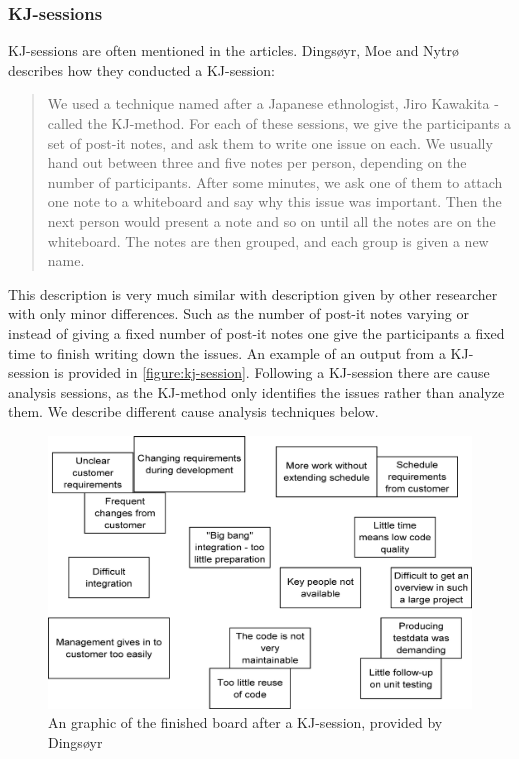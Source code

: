 \documentclass[12pt]{article}
\begin{document}
\subsubsection{KJ-sessions}
KJ-sessions are often mentioned in the articles. Dingsøyr, Moe and Nytrø~\cite{Moe2001} describes how they conducted a KJ-session: 
\begin{quote} We used a technique named after a Japanese ethnologist, Jiro Kawakita - called the KJ-method. For each of these sessions, we give the participants a set of post-it notes, and ask them to write one issue on each. We usually hand out between three and five notes per person, depending on the number of participants. After some minutes, we ask one of them to attach one note to a whiteboard and say why this issue was important. Then the next person would present a note and so on until all the notes are on the whiteboard. The notes are then grouped, and each group is given a new name. 
\end{quote}
This description is very much similar with description given by other researcher with only minor differences. Such as the number of post-it notes varying or instead of giving a fixed number of post-it notes one give the participants a fixed time to finish writing down the issues. An example of an output from a KJ-session is provided in \autoref{figure:kj-session}.  Following a KJ-session there are cause analysis sessions, as the KJ-method only identifies the issues rather than analyze them. We describe different cause analysis techniques below. 

\begin{figure}[h!]
	\centering
	\includegraphics[width=\textwidth]{figures/KJ-session.png}
	\caption{An graphic of the finished board after a KJ-session, provided by Dingsøyr~\cite{Dingsoyr2005}}
	\label{figure:kj-session}
\end{figure}
\end{document}
